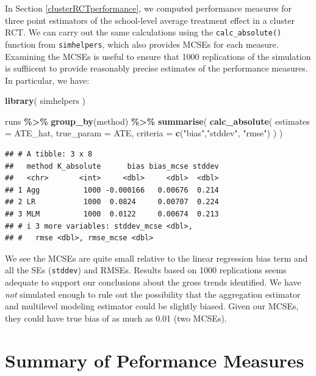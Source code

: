 \documentclass[
]{book}
\newenvironment{Shaded}{\begin{snugshade}}{\end{snugshade}}
\newcommand{\AttributeTok}[1]{\textcolor[rgb]{0.13,0.29,0.53}{#1}}
\newcommand{\FunctionTok}[1]{\textcolor[rgb]{0.13,0.29,0.53}{\textbf{#1}}}
\newcommand{\NormalTok}[1]{#1}
\newcommand{\SpecialCharTok}[1]{\textcolor[rgb]{0.81,0.36,0.00}{\textbf{#1}}}
\newcommand{\StringTok}[1]{\textcolor[rgb]{0.31,0.60,0.02}{#1}}
\begin{document}
In Section \ref{clusterRCTperformance}, we computed performance measures for three point estimators of the school-level average treatment effect in a cluster RCT.
We can carry out the same calculations using the \texttt{calc\_absolute()} function from \texttt{simhelpers}, which also provides MCSEs for each measure.
Examining the MCSEs is useful to ensure that 1000 replications of the simulation is suffiicent to provide reasonably precise estimates of the performance measures.
In particular, we have:

\begin{Shaded}
\begin{Highlighting}[]
\FunctionTok{library}\NormalTok{( simhelpers )}

\NormalTok{runs }\SpecialCharTok{\%\textgreater{}\%} 
  \FunctionTok{group\_by}\NormalTok{(method) }\SpecialCharTok{\%\textgreater{}\%}
  \FunctionTok{summarise}\NormalTok{( }
    \FunctionTok{calc\_absolute}\NormalTok{( }
      \AttributeTok{estimates =}\NormalTok{ ATE\_hat, }\AttributeTok{true\_param =}\NormalTok{ ATE,}
      \AttributeTok{criteria =} \FunctionTok{c}\NormalTok{(}\StringTok{"bias"}\NormalTok{,}\StringTok{"stddev"}\NormalTok{, }\StringTok{"rmse"}\NormalTok{)}
\NormalTok{    ) }
\NormalTok{  )}
\end{Highlighting}
\end{Shaded}

\begin{verbatim}
## # A tibble: 3 x 8
##   method K_absolute      bias bias_mcse stddev
##   <chr>       <int>     <dbl>     <dbl>  <dbl>
## 1 Agg          1000 -0.000166   0.00676  0.214
## 2 LR           1000  0.0824     0.00707  0.224
## 3 MLM          1000  0.0122     0.00674  0.213
## # i 3 more variables: stddev_mcse <dbl>,
## #   rmse <dbl>, rmse_mcse <dbl>
\end{verbatim}

We see the MCSEs are quite small relative to the linear regression bias term and all the SEs (\texttt{stddev}) and RMSEs. Results based on 1000 replications seems adequate to support our conclusions about the gross trends identified.
We have \emph{not} simulated enough to rule out the possibility that the aggregation estimator and multilevel modeling estimator could be slightly biased. Given our MCSEs, they could have true bias of as much as 0.01 (two MCSEs).

\section{Summary of Peformance Measures}\label{summary-of-peformance-measures}
\end{document}
